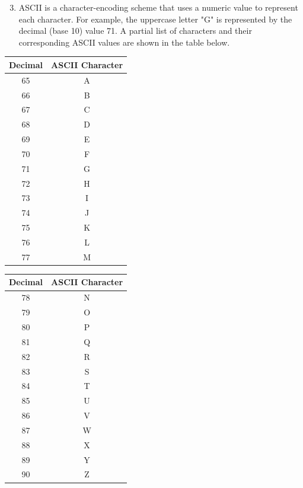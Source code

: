 \documentclass[10pt]{article}
\begin{document}
\begin{enumerate}
  \setcounter{enumi}{2}
  \item ASCII is a character-encoding scheme that uses a numeric value to represent each character. For example, the uppercase letter "G" is represented by the decimal (base 10) value 71. A partial list of characters and their corresponding ASCII values are shown in the table below.
\end{enumerate}

\begin{center}
\begin{tabular}{|c|c|}
\hline
Decimal & ASCII Character \\
\hline
65 & A \\
\hline
66 & B \\
\hline
67 & C \\
\hline
68 & D \\
\hline
69 & E \\
\hline
70 & F \\
\hline
71 & G \\
\hline
72 & H \\
\hline
73 & I \\
\hline
74 & J \\
\hline
75 & K \\
\hline
76 & L \\
\hline
77 & M \\
\hline
\end{tabular}
\end{center}

\begin{center}
\begin{tabular}{|c|c|}
\hline
Decimal & ASCII Character \\
\hline
78 & N \\
\hline
79 & O \\
\hline
80 & P \\
\hline
81 & Q \\
\hline
82 & R \\
\hline
83 & S \\
\hline
84 & T \\
\hline
85 & U \\
\hline
86 & V \\
\hline
87 & W \\
\hline
88 & X \\
\hline
89 & Y \\
\hline
90 & Z \\
\hline
\end{tabular}
\end{center}
\end{document}
